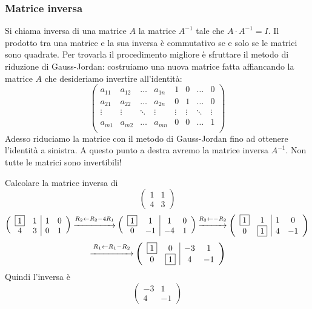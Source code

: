 \documentclass{article}     %
\begin{document}
\subsubsection{Matrice inversa}
Si chiama inversa di una matrice $A$ la matrice $A^{-1}$ tale che $A\cdot A^{-1}=I$. Il prodotto tra una matrice e la sua inversa è commutativo se e solo se le matrici sono quadrate. Per trovarla il procedimento migliore è sfruttare il metodo di riduzione di Gauss-Jordan: costruiamo una nuova matrice fatta affiancando la matrice $A$ che desideriamo invertire all'identità:
\[\left( \begin{array}{cccc|cccc}
    a_{11}& a_{12}&\dots&a_{1n}& 1&0&\dots &0\\
    a_{21}& a_{22}&\dots&a_{2n}& 0&1&\dots &0\\
    \vdots & \vdots & \ddots& \vdots& \vdots & \vdots & \ddots & \vdots\\
    a_{m1}& a_{m2}&\dots&a_{mn}& 0&0&\dots &1\\
\end{array} \right)\]
Adesso riduciamo la matrice con il metodo di Gauss-Jordan fino ad ottenere l'identità a sinistra. A questo punto a destra avremo la matrice inversa $A^{-1}$. Non tutte le matrici sono invertibili!
\begin{ex}
    Calcolare la matrice inversa di \[\begin{pmatrix} 1&1\\4&3 \end{pmatrix} \]
    \[\left(\begin{array}{cc|cc}
        \boxed{1}&1&1&0\\
        4&3&0&1
    \end{array}\right)
    \overset{R_2\leftarrow R_2 - 4R_1}{\xrightarrow{\hspace{1.6cm}}}
    \left(\begin{array}{cc|cc}
        \boxed{1}&1&1&0\\
        0&- 1&- 4&1
    \end{array}\right)
    \overset{R_2\leftarrow -R_2}{\xrightarrow{\hspace{1cm}}}
    \left(\begin{array}{cc|cc}
        \boxed{1}&1&1&0\\
        0&\boxed{1}&4&-1
    \end{array}\right)\]\[
    \overset{R_1\leftarrow R_1-R_2}{\xrightarrow{\hspace{1.6cm}}}
    \left(\begin{array}{cc|cc}
        \boxed{1}&0&-3&1\\
        0&\boxed{1}&4&-1
    \end{array}\right)
    \]
    Quindi l'inversa è 
    \[\begin{pmatrix} - 3&1\\4&- 1 \end{pmatrix} \]
\end{ex}
\end{document}
